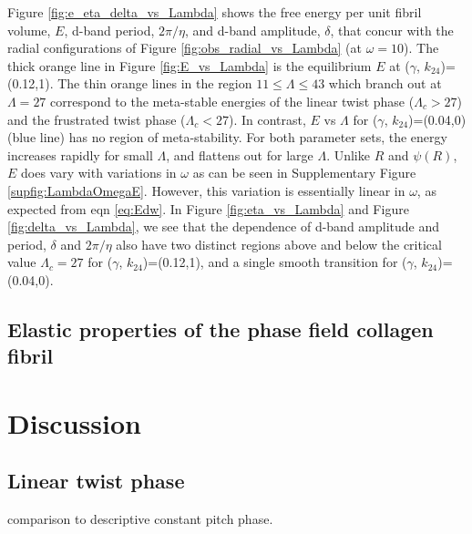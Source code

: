 \documentclass[%
 reprint,
 amsmath,amssymb,
 aps,
]{revtex4-1}
\begin{document}
Figure \ref{fig:e_eta_delta_vs_Lambda} shows the free energy per unit fibril volume, $E$, d-band period, $2\pi/\eta$, and d-band amplitude, $\delta$, that concur with the radial configurations of Figure \ref{fig:obs_radial_vs_Lambda} (at $\omega=10$). The thick orange line in Figure \ref{fig:E_vs_Lambda} is the equilibrium $E$ at ($\gamma$, $k_{24}$)=(0.12,1). The thin orange lines in the region $11\leq\Lambda\leq43$ which branch out at $\Lambda=27$ correspond to the meta-stable energies of the linear twist phase ($\Lambda_c>27$) and the frustrated twist phase ($\Lambda_c<27$). In contrast, $E$ vs $\Lambda$ for ($\gamma$, $k_{24}$)=(0.04,0) (blue line) has no region of meta-stability. For both parameter sets, the energy increases rapidly for small $\Lambda$, and flattens out for large $\Lambda$. Unlike $R$ and $\psi(R)$, $E$ does vary with variations in $\omega$ as can be seen in Supplementary Figure \ref{supfig:LambdaOmegaE}. However, this variation is essentially linear in $\omega$, as expected from eqn \ref{eq:Edw}. In Figure \ref{fig:eta_vs_Lambda} and Figure \ref{fig:delta_vs_Lambda}, we see that the dependence of d-band amplitude and period, $\delta$ and $2\pi/\eta$ also have two distinct regions above and below the critical value $\Lambda_c=27$ for ($\gamma$, $k_{24}$)=(0.12,1), and a single smooth transition for ($\gamma$, $k_{24}$)=(0.04,0).



\subsection{\label{sub:elasticproperties}Elastic properties of the phase field collagen fibril}





\section{\label{sec:discussion}Discussion}
\subsection{\label{sub:linear}Linear twist phase}
comparison to descriptive constant pitch phase.
\end{document}
